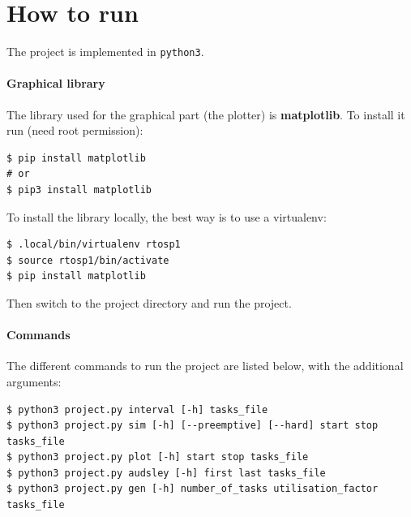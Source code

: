 \documentclass[letterpaper]{article}
\begin{document}
\section{How to run}

\label{sec:howto}

The project is implemented in \texttt{python3}.

\paragraph{Graphical library}

The library used for the graphical part (the plotter) is \textbf{matplotlib}.
To install it run (need root permission):

\begin{lstlisting}[numbers=none]
$ pip install matplotlib
# or
$ pip3 install matplotlib
\end{lstlisting}

To install the library locally, the best way is to use a virtualenv:

\begin{lstlisting}[numbers=none]
$ .local/bin/virtualenv rtosp1
$ source rtosp1/bin/activate
$ pip install matplotlib
\end{lstlisting}

Then switch to the project directory and run the project.

\paragraph{Commands}

The different commands to run the project are listed below, with the additional
arguments:
\begin{lstlisting}[numbers=none]
$ python3 project.py interval [-h] tasks_file
$ python3 project.py sim [-h] [--preemptive] [--hard] start stop tasks_file
$ python3 project.py plot [-h] start stop tasks_file
$ python3 project.py audsley [-h] first last tasks_file
$ python3 project.py gen [-h] number_of_tasks utilisation_factor tasks_file
\end{lstlisting}
\end{document}
